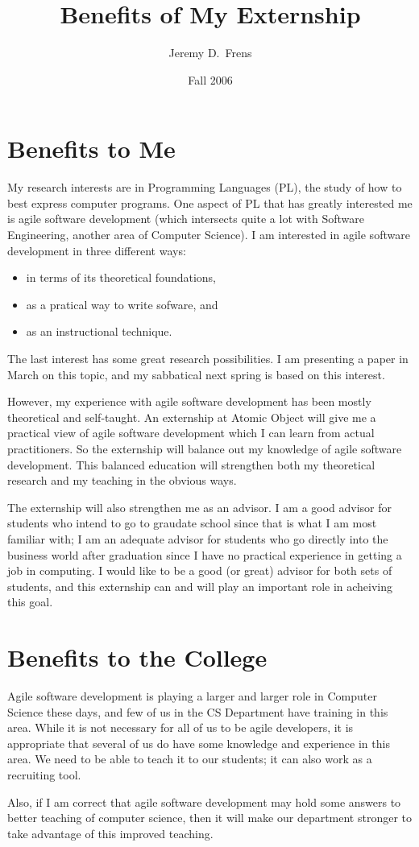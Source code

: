 \documentclass{article}
\title{Benefits of My Externship}
\author{Jeremy D.\ Frens}
\date{Fall 2006}
\begin{document}
\maketitle

\thispagestyle{empty}

\section*{Benefits to Me}

My research interests are in Programming Languages (PL), the study of how to best express computer programs.  One aspect of PL that has greatly interested me is agile software development (which intersects quite a lot with Software Engineering, another area of Computer Science).  I am interested in agile software development in three different ways:
  \begin{itemize}
  \item in terms of its theoretical foundations,
  \item as a pratical way to write sofware, and
  \item as an instructional technique.
  \end{itemize}
The last interest has some great research possibilities.  I am presenting a paper in March on this topic, and my sabbatical next spring is based on this interest.

However, my experience with agile software development has been mostly theoretical and self-taught.  An externship at Atomic Object will give me a practical view of agile software development which I can learn from actual practitioners.  So the externship will balance out my knowledge of agile software development.  This balanced education will strengthen both my theoretical research and my teaching in the obvious ways.

The externship will also strengthen me as an advisor.  I am a good advisor for students who intend to go to graudate school since that is what I am most familiar with; I am an adequate advisor for students who go directly into the business world after graduation since I have no practical experience in getting a job in computing.  I would like to be a good (or great) advisor for both sets of students, and this externship can and will play an important role in acheiving this goal.

\section*{Benefits to the College}

Agile software development is playing a larger and larger role in Computer Science these days, and few of us in the CS Department have training in this area.  While it is not necessary for all of us to be agile developers, it is appropriate that several of us do have some knowledge and experience in this area.  We need to be able to teach it to our students; it can also work as a recruiting tool.

Also, if I am correct that agile software development may hold some answers to better teaching of computer science, then it will make our department stronger to take advantage of this improved teaching.

\end{document}
